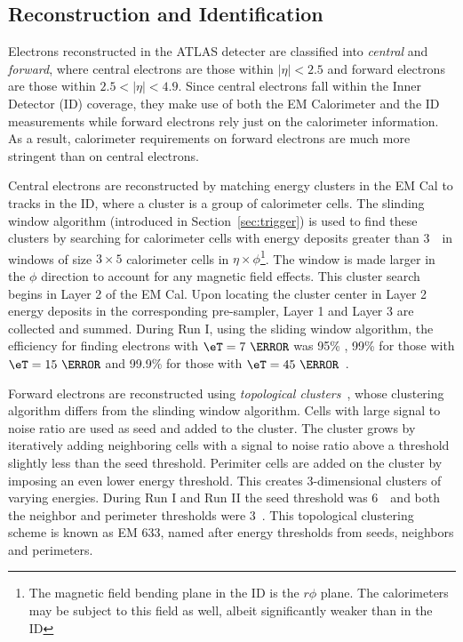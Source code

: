 \subsection{Reconstruction and Identification}
\label{sec:eleReco}
\par Electrons reconstructed in the ATLAS detecter are classified into {\it central} 
and {\it forward}, where central electrons are those within $|\eta|<2.5$ and 
forward electrons are those within $2.5<|\eta|<4.9$.
Since central electrons fall within the Inner Detector (ID) coverage, they make use 
of both the EM Calorimeter and the ID measurements while 
forward electrons rely just on the calorimeter information. As a result, calorimeter 
requirements on forward electrons are much more stringent than on central 
electrons.

\par Central electrons are reconstructed by matching energy clusters in the EM Cal 
to tracks in the ID, where a cluster is a group of calorimeter cells.
The slinding window algorithm (introduced in Section~\ref{sec:trigger}) is used 
to find these clusters by searching for calorimeter cells with energy deposits greater 
than 3~\GeV\ in windows of size $3\times 5$ calorimeter cells in $\eta\times\phi$\footnote{
The magnetic field bending plane in the ID is the $r\phi$ plane. The calorimeters may be subject 
to this field as well, albeit significantly weaker than in the ID}. The window 
is made larger in the $\phi$ direction to account for any magnetic field effects. This cluster 
search begins in Layer 2 of the EM Cal. Upon locating the cluster center in Layer 2 energy deposits 
in the corresponding pre-sampler, Layer 1 and Layer 3 are collected and summed. During Run I, using 
the sliding window algorithm, the efficiency for finding electrons with $\eT=7~\GeV$ was 95\% 
, 99\% for those with $\eT=15~\GeV$ and 99.9\% for those with $\eT=45~\GeV$~\cite{Aad:2014fxa}. 

\par Forward electrons are reconstructed using {\it topological clusters}~\cite{Lampl:2008zz}, whose clustering algorithm 
differs from the slinding window algorithm. Cells with large signal to noise ratio are used as seed and 
added to the cluster. The cluster grows by iteratively adding neighboring cells with a signal to noise ratio above a 
threshold slightly less than the seed threshold. Perimiter cells are added on the cluster by 
imposing an even lower energy threshold. This creates 3-dimensional clusters of varying energies. 
During Run I and Run II the seed threshold was 6~\GeV\ and both the neighbor and perimeter 
thresholds were 3~\GeV. This topological clustering scheme is known as EM 633, named after 
energy thresholds from seeds, neighbors and perimeters. 


